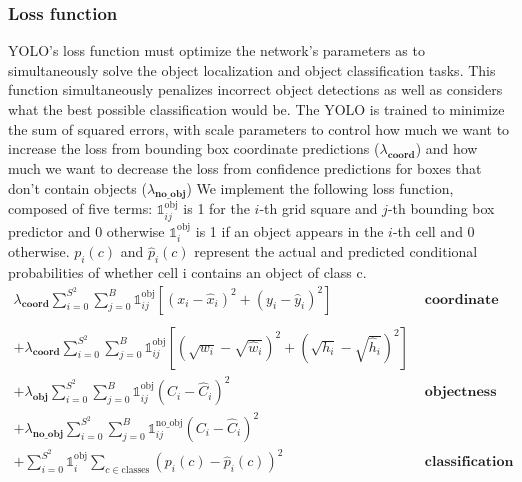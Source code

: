 \documentclass[a4paper]{article}
\begin{document}
\subsubsection*{Loss function}


YOLO’s loss function must optimize the network's parameters as to simultaneously solve the object localization and object classification tasks. This function
simultaneously penalizes incorrect object detections
as well as considers what the best possible classification
would be. The YOLO is trained to minimize the sum of squared errors, with scale parameters to control how much we want to increase the loss from bounding box coordinate predictions ($\lambda_\textbf{coord}$) and how much we want to decrease the loss from confidence predictions for boxes that don’t contain objects ($\lambda_\textbf{no\_obj}$) We
implement the following loss function, composed of five
terms:
${\mathbb{1}}_{ij}^{\text{obj}}$ is 1 for the $i$-th grid square and $j$-th bounding box predictor and 0 otherwise ${{\mathbb{1}}}_i^{\text{obj}}$ is 1 if an object appears in the $i$-th cell and 0 otherwise.
$p_i(c)$ and $\hat{p}_i(c)$ represent the actual and predicted conditional probabilities of whether cell i contains an object of class c.
\begin{align*}
\lambda_\textbf{coord}
\sum_{i = 0}^{S^2}
    \sum_{j = 0}^{B}
     {\mathbb{1}}_{ij}^{\text{obj}}
            \left[
            \left(
                x_i - \hat{x}_i
            \right)^2 +
            \left(
                y_i - \hat{y}_i
            \right)^2
            \right]&\textbf{\ coordinate loss}
\\\\
+ \lambda_\textbf{coord} 
\sum_{i = 0}^{S^2}
    \sum_{j = 0}^{B}
         {\mathbb{1}}_{ij}^{\text{obj}}
         \left[
        \left(
            \sqrt{w_i} - \sqrt{\hat{w}_i}
        \right)^2 +
        \left(
            \sqrt{h_i} - \sqrt{\hat{h}_i}
        \right)^2
        \right]\\
+ \lambda_\textbf{obj}\sum_{i = 0}^{S^2}
    \sum_{j = 0}^{B}
        {\mathbb{1}}_{ij}^{\text{obj}}
        \left(
            C_i - \hat{C}_i
        \right)^2&\textbf{\ objectness loss}
\\
+ \lambda_\textbf{no\_obj}
\sum_{i = 0}^{S^2}
    \sum_{j = 0}^{B}
    {\mathbb{1}}_{ij}^{\text{no\_obj}}
        \left(
            C_i - \hat{C}_i
        \right)^2\\ 
+ \sum_{i = 0}^{S^2}
{{\mathbb{1}}}_i^{\text{obj}}
    \sum_{c \in \textrm{classes}}
        \left(
            p_i(c) - \hat{p}_i(c)
        \right)^2&\textbf{\ classification loss}
\end{align*}
\end{document}

